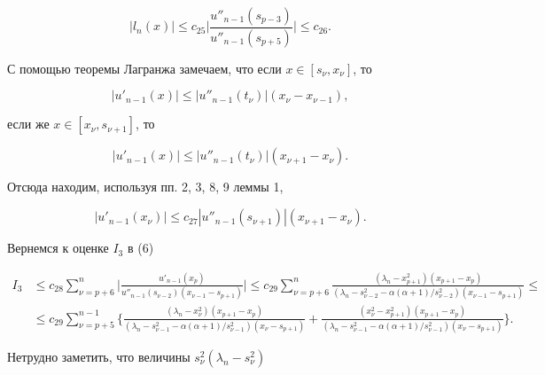 $$


|l_n(x)|\leq c_{25}\bigg|\frac{u''_{n-1}(s_{p-3})}


{u''_{n-1}(s_{p+5})}\bigg|\leq c_{26}.


$$


С помощью теоремы Лагранжа замечаем, что если $x\in[s_\nu,x_\nu]$, то


$$


|u'_{n-1}(x)|\leq|u''_{n-1}(t_\nu)|(x_\nu-x_{\nu-1}),


$$ 


если же $x\in[x_\nu,s_{\nu+1}]$, то


$$


|u'_{n-1}(x)|\leq|u''_{n-1}(t_\nu)|(x_{\nu+1}-x_\nu).


$$


Отсюда находим, используя пп. 2, 3, 8, 9 леммы 1,


$$


|u'_{n-1}(x_\nu)|\leq c_{27}


|u''_{n-1}(s_{\nu+1})|(x_{\nu+1}-x_\nu).


$$


Вернемся к оценке $I_3$ в (6)


\begin{align*}


I_3&\leq c_{28}\sum_{\nu=p+6}^{n}\bigg|


\frac{u'_{n-1}(x_p)}{u''_{n-1}(s_{\nu-2})


(x_{\nu-1}-s_{p+1})}\bigg|\leq c_{29}\sum_{\nu=p+6}^{n}


\frac{(\lambda_n-x^2_{p+1})(x_{p+1}-x_p)}


{(\lambda_n-s^2_{\nu-2}-\alpha(\alpha+1)/s_{\nu-2}^2)


(x_{\nu-1}-s_{p+1})}\leq \\


%


&\leq c_{29}\sum_{\nu=p+5}^{n-1}\bigg\{


\frac{(\lambda_n-x^2_\nu)(x_{p+1}-x_p)}


{(\lambda_n-s^2_{\nu-1}-\alpha(\alpha+1)/


s_{\nu-1}^2)(x_\nu-s_{p+1})}+


\frac{(x^2_\nu-x^2_{p+1})(x_{p+1}-x_p)}


{(\lambda_n-s^2_{\nu-1}-\alpha(\alpha+1)/s_{\nu-1}^2)


(x_\nu-s_{p+1})}\bigg\}.


\end{align*}


Нетрудно заметить, что величины $s^2_\nu(\lambda_n-s^2_\nu)$ 


